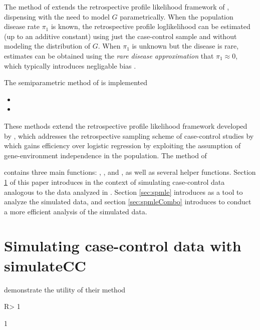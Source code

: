 \documentclass[nojss]{jss}
\begin{document}
The method of \citet{Stalder2017} extends the retrospective profile
likelihood framework of \citeauthor{ChatterjeeCarroll2005}, dispensing
with the need to model \(G\) parametrically. When the population disease
rate \(\pi_1\) is known, the retrospective profile loglikelihood can be
estimated (up to an additive constant) using just the case-control
sample and without modeling the distribution of \(G\). When \(\pi_1\) is
unknown but the disease is rare, estimates can be obtained using the
\emph{rare disease approximation} that \(\pi_1 \approx 0\), which
typically introduces negligable bias \citep{Stalder2017}.

The semiparametric method of \citet{Stalder2017} is implemented

\begin{itemize}
\item
\item
\end{itemize}

These methods extend the retrospective profile likelihood framework
developed by \citet{ChatterjeeCarroll2005}, which addresses the
retrospective sampling scheme of case-control studies by which gains
efficiency over logistic regression by exploiting the assumption of
gene-environment independence in the population. The method of
\citeauthor{ChatterjeeCarroll2005}

 contains three main functions: ,
, and , as well as several helper
functions. Section \ref{sec:simulateCC} of this paper introduces
 in the context of simulating case-control data
analogous to the data analyzed in \cite{Wang2018unpublished}. Section
\ref{sec:spmle} introduces  as a tool to analyze the
simulated data, and section \ref{sec:spmleCombo} introduces
 to conduct a more efficient analysis of the simulated
data.

\section{Simulating case-control data with simulateCC} \label{sec:simulateCC}

\cite{Wang2018unpublished} demonstrate the utility of their method

\begin{CodeChunk}

\begin{CodeInput}
R> 1
\end{CodeInput}

\begin{CodeOutput}
[1] 1
\end{CodeOutput}
\end{CodeChunk}
\end{document}
